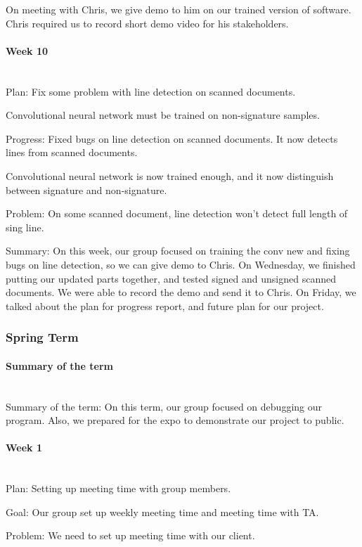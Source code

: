 \documentclass[article, onecolumn, draftclsnofoot,10pt, compsoc]{IEEEtran}
\begin{document}
On meeting with Chris, we give demo to him on our trained version of software. Chris required us to record short demo video for his stakeholders.

\paragraph{Week 10}
\mbox{}\\
Plan: Fix some problem with line detection on scanned documents.

Convolutional neural network must be trained on non-signature samples.
 
Progress: Fixed bugs on line detection on scanned documents. It now detects lines from scanned documents.

Convolutional neural network is now trained enough, and it now distinguish between signature and non-signature.
 
Problem: On some scanned document, line detection won't detect full length of sing line.

Summary: On this week, our group focused on training the conv new and fixing bugs on line detection, so we can give demo to Chris. On Wednesday, we finished putting our updated parts together, and tested signed and unsigned scanned documents. We were able to record the demo and send it to Chris. On Friday, we talked about the plan for progress report, and future plan for our project.

\subsubsection{Spring Term}
\paragraph{Summary of the term}
\mbox{}\\
Summary of the term: On this term, our group focused on debugging our program. Also, we prepared for the expo to demonstrate our project to public.

\paragraph{Week 1}
\mbox{}\\
Plan: Setting up meeting time with group members.

Goal: Our group set up weekly meeting time and meeting time with TA.

Problem: We need to set up meeting time with our client.
\end{document}
